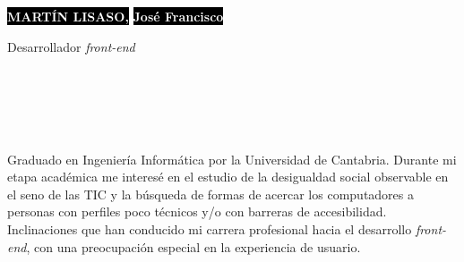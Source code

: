 \documentclass[9pt]{developercv} %
\begin{document}
%
%

\begin{minipage}[t]{0.6\textwidth}
	\vspace{-\baselineskip} %

	\colorbox{black}{{\HUGE\textcolor{white}{\textbf{\MakeUppercase{Martín Lisaso,}}}}}
	\colorbox{black}{{\HUGE\textcolor{white}{\textbf{José Francisco}}}}

	\vspace{6pt}

	{\huge Desarrollador \emph{front-end}}
\end{minipage}
\hfill
\begin{minipage}[t]{0.3\textwidth}
	\vspace{-\baselineskip} %

	\\
	\\
	\\
	\\
\end{minipage}

\vspace{0.5cm}

%
%


\begin{minipage}[t]{0.45\textwidth} %
	\vspace{-\baselineskip} %
	
	Graduado en Ingeniería Informática por la Universidad de Cantabria. Durante mi etapa académica me interesé en el estudio de la desigualdad social observable en el seno de las TIC y la búsqueda de formas de acercar los computadores a personas con perfiles poco técnicos y/o con barreras de accesibilidad. Inclinaciones que han conducido mi carrera profesional hacia el desarrollo \emph{front-end}, con una preocupación especial en la experiencia de usuario.\\
\end{minipage}
\hfill %
\begin{minipage}[t]{0.5\textwidth} %
	\vspace{-\baselineskip} %
	\begin{barchart}{5.5}
	\end{barchart}
\end{minipage}
\end{document}
